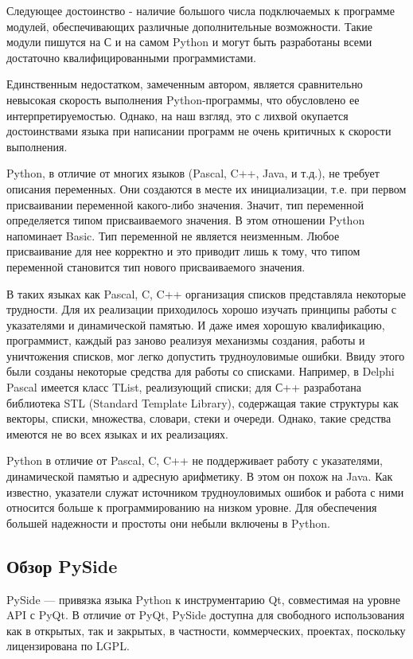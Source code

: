 Следующее достоинство - наличие большого числа подключаемых к программе модулей, обеспечивающих различные дополнительные возможности. Такие модули пишутся на
С и на самом Python и могут быть разработаны всеми достаточно квалифицированными программистами.

Единственным недостатком, замеченным автором, является сравнительно невысокая скорость выполнения Python-программы, что обусловлено ее интерпретируемостью.
Однако, на наш взгляд, это с лихвой окупается достоинствами языка при написании программ не очень критичных к скорости выполнения. 

Python, в отличие от многих языков (Pascal, C++, Java, и т.д.), не требует описания переменных. Они создаются в месте их инициализации, т.е. 
при первом присваивании переменной какого-либо значения. Значит, тип переменной определяется типом присваиваемого значения. В этом отношении Python напоминает Basic. 
Тип переменной не является неизменным. Любое присваивание для нее корректно и это приводит лишь к тому, что типом переменной становится тип нового присваиваемого значения.

В таких языках как Pascal, C, C++ организация списков представляла некоторые трудности. Для их реализации приходилось хорошо изучать принципы работы с указателями и динамической памятью. И даже имея хорошую квалификацию, программист, каждый раз заново реализуя механизмы создания, работы и уничтожения списков, мог легко допустить трудноуловимые ошибки.
Ввиду этого были созданы некоторые средства для работы со списками. Например, в Delphi Pascal имеется класс TList, реализующий списки; для С++ 
разработана библиотека STL (Standard Template Library), содержащая такие структуры как векторы, списки, множества, словари, стеки и очереди. Однако, такие средства имеются не во всех языках и их реализациях.

Python в отличие от Pascal, C, C++ не поддерживает работу с указателями, динамической памятью и адресную арифметику. В этом он похож на Java. Как известно, указатели служат источником трудноуловимых ошибок и работа с ними относится больше к программированию на низком уровне.
Для обеспечения большей надежности и простоты они небыли включены в Python.

\subsection{Обзор PySide}
\label{subsec:qt-overview}

PySide — привязка языка Python к инструментарию Qt, совместимая на уровне API с PyQt.
В отличие от PyQt, PySide доступна для свободного использования как в открытых, так и закрытых, в частности, коммерческих, 
проектах, поскольку лицензирована по LGPL.

